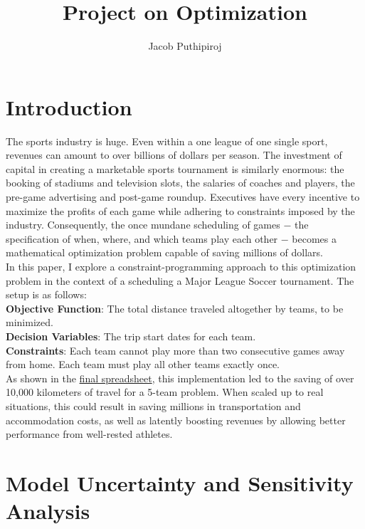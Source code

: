 \documentclass[twoside]{article}
\begin{document}
\title{Project on Optimization}
\author{Jacob Puthipiroj}
\date{}
\maketitle

\section*{Introduction}
The sports industry is huge. Even within a one league of one single sport, revenues can amount to over billions of dollars per season. The investment of capital in creating a marketable sports tournament is similarly enormous: the booking of stadiums and television slots, the salaries of coaches and players, the pre-game advertising and post-game roundup. Executives have every incentive to maximize the profits of each game while adhering to constraints imposed by the industry. Consequently, the once mundane scheduling of games $-$ the specification of when, where, and which teams play each other $-$ becomes a mathematical optimization problem capable of saving millions of dollars. \\

In this paper, I explore a constraint-programming approach to this optimization problem in the context of a scheduling a Major League Soccer tournament. The setup is as follows: \\

 \textbf{Objective Function}: The total distance traveled altogether by teams, to be minimized. \\
  \textbf{Decision Variables}: The trip start dates for each team. \\ 
 \textbf{Constraints}: Each team cannot play more than two consecutive games away from home. Each team must play all other teams exactly once. \\

As shown in the \href{https://docs.google.com/spreadsheets/d/1eGgyUOwjtrGtbim5T5FRE0Uae482cQo0NV0-RXekXss/edit?usp=sharing}{final spreadsheet}, this implementation led to the saving of over 10,000 kilometers of travel for a 5-team problem. When scaled up to real situations, this could result in saving millions in transportation and accommodation costs, as well as latently boosting revenues by allowing better performance from well-rested athletes.

\section*{Model Uncertainty and Sensitivity Analysis}
\end{document}
